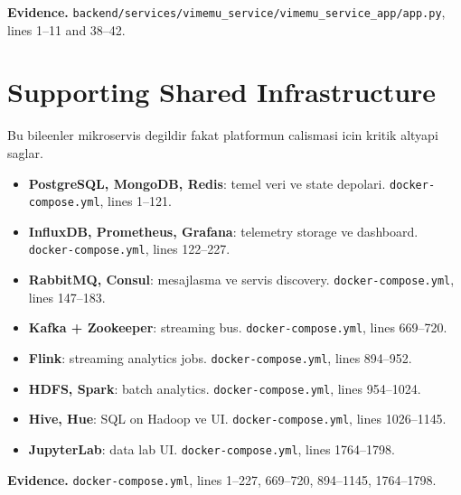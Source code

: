 \documentclass[10pt,a4paper]{article}
\begin{document}
\textbf{Evidence.} \texttt{backend/services/vimemu\_service/vimemu\_service\_app/app.py}, lines 1--11 and 38--42.

\section{Supporting Shared Infrastructure}

Bu bileenler mikroservis degildir fakat platformun calismasi icin kritik altyapi saglar.

\begin{itemize}[leftmargin=*]
\item \textbf{PostgreSQL, MongoDB, Redis}: temel veri ve state depolari. \texttt{docker-compose.yml}, lines 1--121.
\item \textbf{InfluxDB, Prometheus, Grafana}: telemetry storage ve dashboard. \texttt{docker-compose.yml}, lines 122--227.
\item \textbf{RabbitMQ, Consul}: mesajlasma ve servis discovery. \texttt{docker-compose.yml}, lines 147--183.
\item \textbf{Kafka + Zookeeper}: streaming bus. \texttt{docker-compose.yml}, lines 669--720.
\item \textbf{Flink}: streaming analytics jobs. \texttt{docker-compose.yml}, lines 894--952.
\item \textbf{HDFS, Spark}: batch analytics. \texttt{docker-compose.yml}, lines 954--1024.
\item \textbf{Hive, Hue}: SQL on Hadoop ve UI. \texttt{docker-compose.yml}, lines 1026--1145.
\item \textbf{JupyterLab}: data lab UI. \texttt{docker-compose.yml}, lines 1764--1798.
\end{itemize}

\textbf{Evidence.} \texttt{docker-compose.yml}, lines 1--227, 669--720, 894--1145, 1764--1798.
\end{document}
